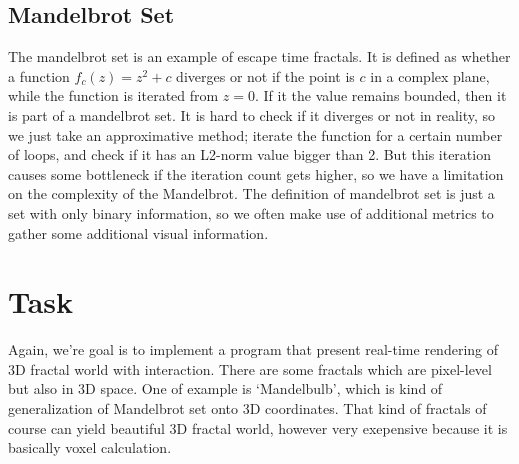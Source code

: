 \documentclass[a4paper]{article}
\begin{document}
\subsection{Mandelbrot Set}
The mandelbrot set is an example of escape time fractals. 
It is defined as whether a function $f_c(z) = z^2 + c$ diverges or not if the point is $c$ in a complex plane, while the function is iterated from $z = 0$. 
If it the value remains bounded, then it is part of a mandelbrot set.
It is hard to check if it diverges or not in reality, so we just take an approximative method; iterate the function for a certain number of loops, and check if it has an L2-norm value bigger than 2. 
But this iteration causes some bottleneck if the iteration count gets higher, so we have a limitation on the complexity of the Mandelbrot.
The definition of mandelbrot set is just a set with only binary information, so we often make use of additional metrics to gather some additional visual information.
\begin{figure}[H]
\centering
{}
\end{figure}

\section{Task}
Again, we're goal is to implement a program that present real-time rendering of 3D fractal world with interaction.
There are some fractals which are pixel-level but also in 3D space.
One of example is `Mandelbulb', which is kind of generalization of Mandelbrot set onto 3D coordinates.
That kind of fractals of course can yield beautiful 3D fractal world, however very exepensive because it is basically voxel calculation.
\end{document}
